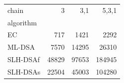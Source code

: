 \begin{tabular}{lrrr}
\toprule
chain & 3 & 3,1 & 5,3,1 \\
algorithm &  &  &  \\
\midrule
EC & 717 & 1421 & 2292 \\
ML-DSA & 7570 & 14295 & 26310 \\
SLH-DSAf & 48829 & 97653 & 184945 \\
SLH-DSAs & 22504 & 45003 & 104280 \\
\bottomrule
\end{tabular}
